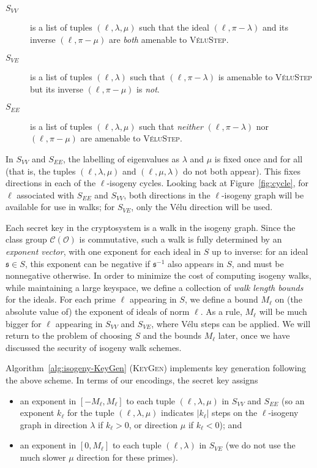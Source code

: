 \documentclass{llncs}
\newcommand{\Cl}{\mathcal{C}}
\renewcommand{\O}{\mathcal{O}}
\newcommand{\algstyle}[1]{\textsc{#1}}
\renewcommand{\frak}{\mathfrak}
\begin{document}
\begin{description}
    \item[$S_{VV}$]
        \label{case:velustep-sym}
        is a list of tuples $(\ell,\lambda,\mu)$
        such that the ideal $(\ell,\pi - \lambda)$ 
        and its inverse $(\ell,\pi-\mu)$
        are \emph{both} amenable to \algstyle{VéluStep}.
    \item[$S_{VE}$]
        \label{case:velustep-asym}
        is a list of tuples $(\ell,\lambda)$
        such that $(\ell,\pi-\lambda)$ is amenable to
        \algstyle{VéluStep} but its inverse $(\ell,\pi-\mu)$ is \emph{not}.
    \item[$S_{EE}$]
        \label{case:elkstep} 
        is a list of tuples $(\ell,\lambda,\mu)$
        such that \emph{neither} $(\ell,\pi - \lambda)$ nor $(\ell,\pi-\mu)$
        are amenable to \algstyle{VéluStep}.
\end{description}

In $S_{VV}$ and $S_{EE}$,
the labelling of eigenvalues as $\lambda$ and $\mu$ 
is fixed once and for all 
(that is, the tuples $(\ell,\lambda,\mu)$ and $(\ell,\mu,\lambda)$ do not
both appear).
This fixes directions in each of the $\ell$-isogeny cycles.
Looking back at Figure~\ref{fig:cycle}, 
for $\ell$ associated with $S_{EE}$ and $S_{VV}$, 
both directions in the $\ell$-isogeny graph will be available for use in
walks; for $S_{VE}$, only the Vélu direction will be used.

Each secret key in the cryptosystem is a walk in the isogeny graph.
Since the class group $\Cl(\O)$ is commutative, such a walk is fully
determined by an \emph{exponent vector}, with one exponent for each ideal in $S$
up to inverse: for an ideal $\frak s\in S$, this exponent can be negative if
$\frak s^{-1}$ also appears in $S$, and must be nonnegative otherwise.
In order to minimize the cost of computing isogeny walks, 
while maintaining a large keyspace,
we define a collection of \emph{walk length bounds} for the ideals.
For each prime $\ell$ appearing in $S$, we define a bound $M_\ell$
on (the absolute value of) the exponent of ideals of norm $\ell$.
As a rule, $M_\ell$ will be much bigger for $\ell$
appearing in $S_{VV}$ and $S_{VE}$, where Vélu steps can be applied.
We will return to the problem of choosing $S$ and the bounds $M_\ell$ later,
once we have discussed the security of isogeny walk schemes.

Algorithm~\ref{alg:isogeny-KeyGen} (\algstyle{KeyGen})
implements key generation following the above scheme.
In terms of our encodings,
the secret key assigns 
\begin{itemize}
    \item
        an exponent in 
        $[-M_\ell,M_\ell]$ to each tuple $(\ell,\lambda,\mu)$ in $S_{VV}$ and $S_{EE}$
        (so an exponent $k_\ell$ for the tuple $(\ell,\lambda,\mu)$
        indicates $|k_\ell|$ steps on the $\ell$-isogeny graph in direction $\lambda$
        if $k_\ell > 0$, or direction $\mu$ if $k_\ell < 0$); and
    \item
        an exponent in $[0,M_\ell]$ to each tuple $(\ell,\lambda)$ in $S_{VE}$
        (we do not use the much slower $\mu$ direction for these primes).
\end{itemize}
\end{document}

